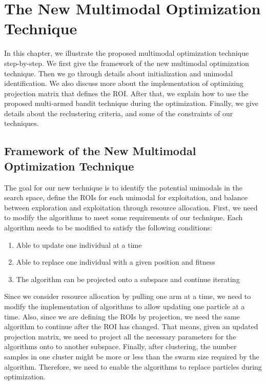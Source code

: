 \chapter{The New Multimodal Optimization Technique}
\label{chapter:new_bandit}

In this chapter, we illustrate the proposed multimodal optimization technique step-by-step. 
We first give the framework of the new multimodal optimization technique.
Then we go through details about initialization and unimodal identification.
We also discuss more about the implementation of optimizing projection matrix that defines the ROI.
After that, we explain how to use the proposed multi-armed bandit technique during the optimization.
Finally, we give details about the reclustering criteria, and some of the constraints of our techniques.


\section{Framework of the New Multimodal Optimization Technique}

The goal for our new technique is to identify the potential unimodals in the search space,
define the ROIs for each unimodal for exploitation,
and balance between exploration and exploitation through resource allocation.
First, we need to modify the algorithms to meet some requirements of our technique.
Each algorithm needs to be modified to satisfy the following conditions:
\begin{enumerate}
    \item Able to update one individual at a time 
    \item Able to replace one individual with a given position and fitness
    \item The algorithm can be projected onto a subspace and continue iterating 
\end{enumerate}

Since we consider resource allocation by pulling one arm at a time, 
we need to modify the implementation of algorithms to allow updating one particle at a time.
Also, since we are defining the ROIs by projection, we need the same algorithm to continue after the ROI has changed.
That means, given an updated projection matrix, 
we need to project all the necessary parameters for the algorithms onto to another subspace.
Finally, after clustering, the number samples in one cluster might be more or less than the swarm size required by the algorithm.
Therefore, we need to enable the algorithms to replace particles during optimization.

